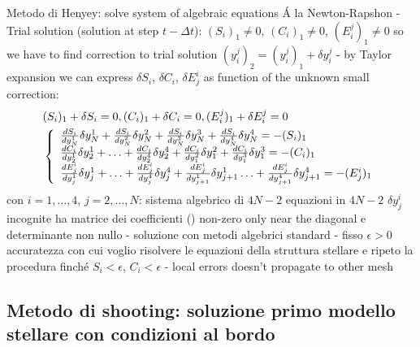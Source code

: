 \begin{frame}{Metodo di Henyey: solve system of algebraic equations}
\'A la Newton-Rapshon - Trial solution (solution at step $t-\Delta t$): $(S_i)_1\neq0$, $(C_i)_1\neq0$, $(E_i^j)_1\neq0$ so we have to find correction to trial solution $(y_i^j)_2=(y_i^j)_1+\delta y_i^j$ - by Taylor expansion we can express $\delta S_i$, $\delta C_i$, $\delta E^i_j$ as function of the unknown small correction:
\begin{align*}
&(S_i)_1+\delta S_i=0, (C_i)_1+\delta C_i=0, (E_i^j)_1+\delta E_i^j=0\\
&\left\{\begin{array}{l}\TDy{y_N^1}{S_i}\delta y_N^1+\TDy{y_N^2}{S_i}\delta y_N^2+\TDy{y_N^3}{S_i}\delta y_N^3+\TDy{y_N^4}{S_i}\delta y_N^4=-(S_i)_1\\
\TDy{y_2^1}{C_i}\delta y_2^1+\ldots+\TDy{y_2^4}{C_i}\delta y_2^4+\TDy{y_1^2}{C_i}\delta y_1^2+\TDy{y_1^3}{C_i}\delta y_1^3=-(C_i)_1\\
\TDy{y_j^1}{E_j^i}\delta y_j^1+\ldots+\TDy{y_j^4}{E_j^i}\delta y_j^4+\TDy{y_{j+1}^1}{E_j^i}\delta y_{j+1}^1\ldots+\TDy{y_{j+1}^4}{E_j^i}\delta y_{j+1}^4=-(E_j^i)_1\\
\end{array}\right.
\end{align*}
con $i=1,\ldots,4$, $j=2,\ldots,N$: sistema algebrico di $4N-2$ equazioni in $4N-2$ $\delta y_j^i$ incognite ha matrice dei coefficienti () non-zero only near the diagonal e determinante non nullo - soluzione con metodi algebrici standard - fisso $\epsilon>0$ accuratezza con cui voglio risolvere le equazioni della struttura stellare e ripeto la procedura finch\'e $S_i<\epsilon$, $C_i<\epsilon$ - local errors doesn't propagate to other mesh
\end{frame}

\subsection{Metodo di shooting: soluzione primo modello stellare con condizioni al bordo}

